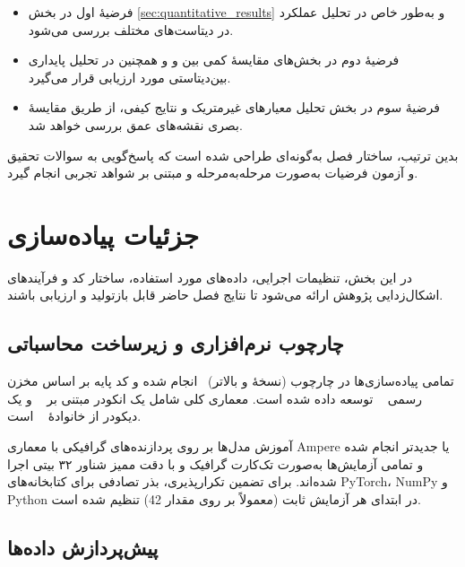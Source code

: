 \begin{itemize}
    \item فرضیهٔ اول در بخش
    \ref{sec:quantitative_results}
    و به‌طور خاص در تحلیل عملکرد \basemodel{}
    در دیتاست‌های مختلف بررسی می‌شود.
    
    \item فرضیهٔ دوم در بخش‌های
    مقایسهٔ کمی بین \basemodel{} و \proposedmodel{}
    و همچنین در تحلیل پایداری بین‌دیتاستی
    \proposedmodel{} مورد ارزیابی قرار می‌گیرد.
    
    \item فرضیهٔ سوم در بخش تحلیل معیارهای غیرمتریک
    و نتایج کیفی، از طریق مقایسهٔ بصری نقشه‌های عمق
    بررسی خواهد شد.
\end{itemize}

بدین ترتیب، ساختار فصل به‌گونه‌ای طراحی شده است
که پاسخ‌گویی به سوالات تحقیق و آزمون فرضیات
به‌صورت مرحله‌به‌مرحله و مبتنی بر شواهد تجربی انجام گیرد.

\section{جزئیات پیاده‌سازی}
\label{sec:implementation_details_ch4}

در این بخش، تنظیمات اجرایی، داده‌های مورد استفاده، ساختار کد و فرآیندهای اشکال‌زدایی پژوهش ارائه می‌شود تا نتایج فصل حاضر قابل بازتولید و ارزیابی باشند.

\subsection{چارچوب نرم‌افزاری و زیرساخت محاسباتی}

تمامی پیاده‌سازی‌ها در چارچوب  (نسخهٔ  و بالاتر)~\cite{Paszke2019PyTorch} انجام شده و کد پایه بر اساس مخزن رسمی ~\cite{DepthAnythingV2} توسعه داده شده است. معماری کلی شامل یک انکودر مبتنی بر ~\cite{Oquab2023DINOv2,Dosovitskiy2020ViT} و یک دیکودر از خانوادهٔ ~\cite{Ranftl2021DPT} است.

آموزش مدل‌ها بر روی پردازنده‌های گرافیکی  با معماری Ampere یا جدیدتر انجام شده و تمامی آزمایش‌ها به‌صورت تک‌کارت گرافیک و با دقت ممیز شناور ۳۲ بیتی اجرا شده‌اند. برای تضمین تکرارپذیری، بذر تصادفی برای کتابخانه‌های PyTorch، NumPy و Python در ابتدای هر آزمایش ثابت (معمولاً بر روی مقدار 42) تنظیم شده است.
\subsection{پیش‌پردازش داده‌ها}

